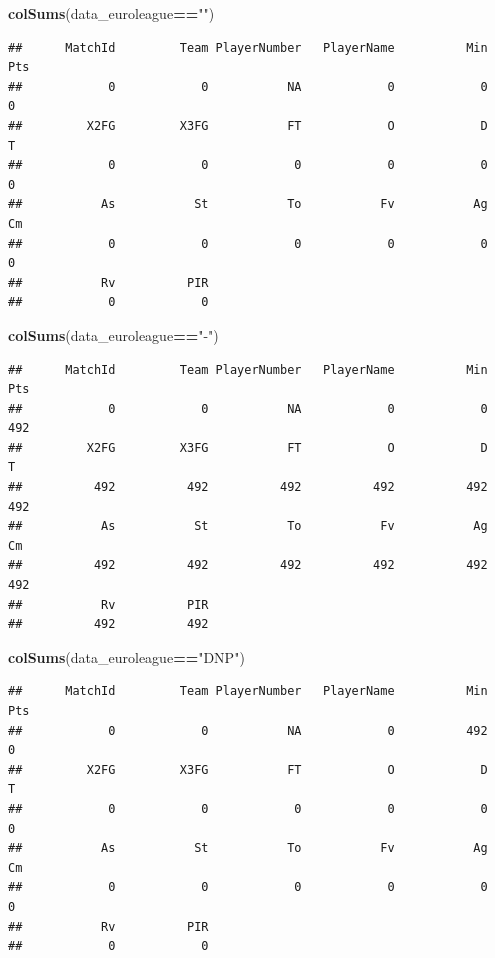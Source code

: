 \documentclass[
]{article}
\newenvironment{Shaded}{\begin{snugshade}}{\end{snugshade}}
\newcommand{\KeywordTok}[1]{\textcolor[rgb]{0.13,0.29,0.53}{\textbf{#1}}}
\newcommand{\NormalTok}[1]{#1}
\newcommand{\OperatorTok}[1]{\textcolor[rgb]{0.81,0.36,0.00}{\textbf{#1}}}
\newcommand{\StringTok}[1]{\textcolor[rgb]{0.31,0.60,0.02}{#1}}
\begin{document}
\begin{Shaded}
\begin{Highlighting}[]
\KeywordTok{colSums}\NormalTok{(data_euroleague}\OperatorTok{==}\StringTok{""}\NormalTok{)}
\end{Highlighting}
\end{Shaded}

\begin{verbatim}
##      MatchId         Team PlayerNumber   PlayerName          Min          Pts 
##            0            0           NA            0            0            0 
##         X2FG         X3FG           FT            O            D            T 
##            0            0            0            0            0            0 
##           As           St           To           Fv           Ag           Cm 
##            0            0            0            0            0            0 
##           Rv          PIR 
##            0            0
\end{verbatim}

\begin{Shaded}
\begin{Highlighting}[]
\KeywordTok{colSums}\NormalTok{(data_euroleague}\OperatorTok{==}\StringTok{"-"}\NormalTok{)}
\end{Highlighting}
\end{Shaded}

\begin{verbatim}
##      MatchId         Team PlayerNumber   PlayerName          Min          Pts 
##            0            0           NA            0            0          492 
##         X2FG         X3FG           FT            O            D            T 
##          492          492          492          492          492          492 
##           As           St           To           Fv           Ag           Cm 
##          492          492          492          492          492          492 
##           Rv          PIR 
##          492          492
\end{verbatim}

\begin{Shaded}
\begin{Highlighting}[]
\KeywordTok{colSums}\NormalTok{(data_euroleague}\OperatorTok{==}\StringTok{"DNP"}\NormalTok{)}
\end{Highlighting}
\end{Shaded}

\begin{verbatim}
##      MatchId         Team PlayerNumber   PlayerName          Min          Pts 
##            0            0           NA            0          492            0 
##         X2FG         X3FG           FT            O            D            T 
##            0            0            0            0            0            0 
##           As           St           To           Fv           Ag           Cm 
##            0            0            0            0            0            0 
##           Rv          PIR 
##            0            0
\end{verbatim}
\end{document}
